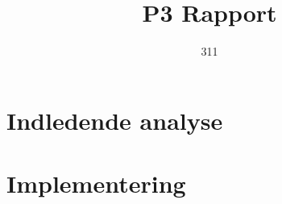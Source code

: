 

\title{P3 Rapport}
\author{311}


\thispagestyle{empty}


\thispagestyle{empty}
\newpage
\mbox{}
\thispagestyle{empty}
\mbox{}
\newpage

\newpage


\newpage
\thispagestyle{empty}
\mbox{}
\newpage





\thispagestyle{empty}
\mbox{}

\newpage
\tableofcontents*

\setpagewiselinenumbers
\modulolinenumbers[5]
\linenumbers



\chapter{Indledende analyse}

%









\chapter{Implementering}
%









\listoffixmes

